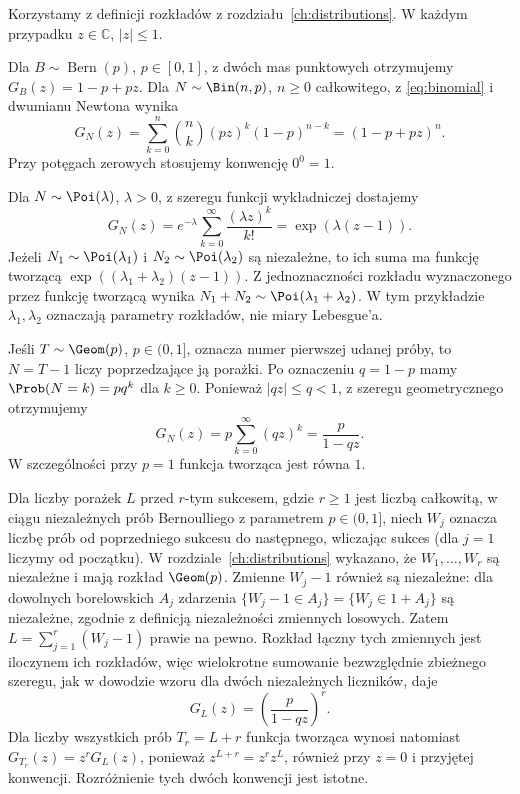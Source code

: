 \begin{przyklad}
Korzystamy z definicji rozkładów z rozdziału~\ref{ch:distributions}.
W każdym przypadku $z\in\mathbb C$, $|z|\leq1$.

Dla $B\sim\operatorname{Bern}(p)$, $p\in[0,1]$,
z dwóch mas punktowych otrzymujemy $G_B(z)=1-p+pz$.
Dla $N\sim\Bin(n,p)$, $n\geq0$ całkowitego, z
\eqref{eq:binomial} i dwumianu Newtona wynika
\[
G_N(z)=\sum_{k=0}^n\binom nk (pz)^k(1-p)^{n-k}
=(1-p+pz)^n.
\]
Przy potęgach zerowych stosujemy konwencję $0^0=1$.

Dla $N\sim\Poi(\lambda)$, $\lambda>0$, z szeregu funkcji
wykładniczej dostajemy
\[
G_N(z)=e^{-\lambda}\sum_{k=0}^\infty\frac{(\lambda z)^k}{k!}
=\exp(\lambda(z-1)).
\]
Jeżeli $N_1\sim\Poi(\lambda_1)$ i $N_2\sim\Poi(\lambda_2)$
są niezależne, to ich suma ma funkcję tworzącą
$\exp((\lambda_1+\lambda_2)(z-1))$.
Z jednoznaczności rozkładu wyznaczonego przez funkcję
tworzącą wynika $N_1+N_2\sim\Poi(\lambda_1+\lambda_2)$.
W tym przykładzie $\lambda_1,\lambda_2$ oznaczają parametry
rozkładów, nie miary Lebesgue'a.

Jeśli $T\sim\Geom(p)$, $p\in(0,1]$, oznacza numer pierwszej
udanej próby, to $N=T-1$ liczy poprzedzające ją porażki.
Po oznaczeniu $q=1-p$ mamy $\Prob(N=k)=pq^k$ dla $k\geq0$.
Ponieważ $|qz|\leq q<1$, z szeregu geometrycznego otrzymujemy
\[
G_N(z)=p\sum_{k=0}^\infty(qz)^k=\frac{p}{1-qz}.
\]
W szczególności przy $p=1$ funkcja tworząca jest równa $1$.

Dla liczby porażek $L$ przed $r$-tym sukcesem, gdzie
$r\geq1$ jest liczbą całkowitą, w ciągu niezależnych prób Bernoulliego
z parametrem $p\in(0,1]$, niech $W_j$ oznacza liczbę prób
od poprzedniego sukcesu do następnego, wliczając sukces
(dla $j=1$ liczymy od początku). W rozdziale~\ref{ch:distributions}
wykazano, że $W_1,\ldots,W_r$ są niezależne i mają rozkład
$\Geom(p)$. Zmienne $W_j-1$ również są niezależne:
dla dowolnych borelowskich $A_j$ zdarzenia
$\{W_j-1\in A_j\}=\{W_j\in 1+A_j\}$ są niezależne,
zgodnie z definicją niezależności zmiennych losowych.
Zatem $L=\sum_{j=1}^r(W_j-1)$ prawie na pewno.
Rozkład łączny tych zmiennych jest iloczynem ich rozkładów,
więc wielokrotne sumowanie bezwzględnie zbieżnego szeregu,
jak w dowodzie wzoru dla dwóch niezależnych liczników, daje
\[
G_L(z)=\left(\frac{p}{1-qz}\right)^r.
\]
Dla liczby wszystkich prób $T_r=L+r$ funkcja tworząca
wynosi natomiast $G_{T_r}(z)=z^rG_L(z)$, ponieważ
$z^{L+r}=z^rz^L$, również przy $z=0$ i przyjętej konwencji.
Rozróżnienie tych dwóch konwencji jest istotne.
\end{przyklad}

